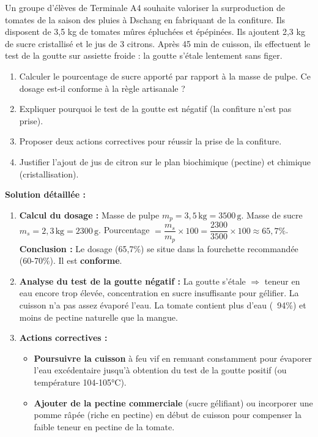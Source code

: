 \documentclass[11pt]{article}
\begin{document}
\begin{exoresolu}
Un groupe d'élèves de Terminale A4 souhaite valoriser la surproduction de tomates de la saison des pluies à Dschang en fabriquant de la confiture. Ils disposent de 3,5 kg de tomates mûres épluchées et épépinées. Ils ajoutent 2,3 kg de sucre cristallisé et le jus de 3 citrons. Après 45 min de cuisson, ils effectuent le test de la goutte sur assiette froide : la goutte s'étale lentement sans figer.
\begin{enumerate}
    \item Calculer le pourcentage de sucre apporté par rapport à la masse de pulpe. Ce dosage est-il conforme à la règle artisanale ?
    \item Expliquer pourquoi le test de la goutte est négatif (la confiture n'est pas prise).
    \item Proposer deux actions correctives pour réussir la prise de la confiture.
    \item Justifier l'ajout de jus de citron sur le plan biochimique (pectine) et chimique (cristallisation).
\end{enumerate}
\tcblower
\textbf{Solution détaillée :}
\begin{enumerate}
    \item \textbf{Calcul du dosage :}
    Masse de pulpe $m_p = 3,5\,\text{kg} = 3500\,\text{g}$.
    Masse de sucre $m_s = 2,3\,\text{kg} = 2300\,\text{g}$.
    Pourcentage $= \dfrac{m_s}{m_p} \times 100 = \dfrac{2300}{3500} \times 100 \approx 65{,}7\%$.
    \textbf{Conclusion :} Le dosage (65,7\%) se situe dans la fourchette recommandée (60-70\%). Il est \textbf{conforme}.
    \item \textbf{Analyse du test de la goutte négatif :} La goutte s'étale $\Rightarrow$ teneur en eau encore trop élevée, concentration en sucre insuffisante pour gélifier. La cuisson n'a pas assez évaporé l'eau. La tomate contient plus d'eau (~94\%) et moins de pectine naturelle que la mangue.
    \item \textbf{Actions correctives :}
    \begin{itemize}
        \item \textbf{Poursuivre la cuisson} à feu vif en remuant constamment pour évaporer l'eau excédentaire jusqu'à obtention du test de la goutte positif (ou température 104-105°C).
        \item \textbf{Ajouter de la pectine commerciale} (sucre gélifiant) ou incorporer une pomme râpée (riche en pectine) en début de cuisson pour compenser la faible teneur en pectine de la tomate.

\end{itemize}
\end{enumerate}
\end{exoresolu}
\end{document}
